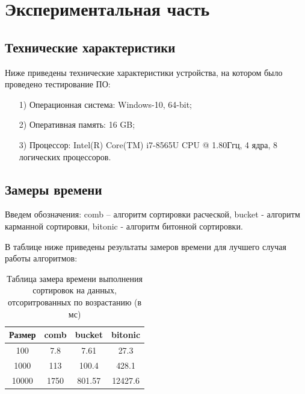 \documentclass[12pt]{report}
\begin{document}
	\chapter{Экспериментальная часть}
	
	\section{Технические характеристики}
	
	Ниже приведены технические характеристики устройства, на котором было проведено тестирование ПО:
	
	\begin{enumerate}
		\item[1)] Операционная система: Windows-10, 64-bit;
		\item[2)] Оперативная память: 16 GB;
		\item[3)] Процессор: Intel(R) Core(TM) i7-8565U CPU @ 1.80Ггц, 4 ядра, 8 логических процессоров.
	\end{enumerate}
	
	\section{Замеры времени}
	
	Введем обозначения: comb -- алгоритм сортировки расческой, bucket - алгоритм карманной сортировки, bitonic - алгоритм битонной сортировки. 
	
	В таблице ниже приведены результаты замеров времени для лучшего случая работы алгоритмов:
	
	\begin{table} [H]
		\caption{Таблица замера времени выполнения сортировок на данных, отсоритрованных по возрастанию (в мс)}
		\begin{center}
			\begin{tabular}{|c | c | c | c|}
				
				\hline
				
				Размер & comb & bucket & bitonic  \\ [0.5ex]
				
				\hline
				
				100 & 7.8 & 7.61 & 27.3 \\ 
				
				\hline 
				
				1000 & 113 & 100.4 & 428.1 \\ 
				
				\hline 
				
				10000 & 1750 & 801.57 & 12427.6 \\ 
				
				\hline 
			\end{tabular}
		\end{center}
	\end{table}
\end{document}
